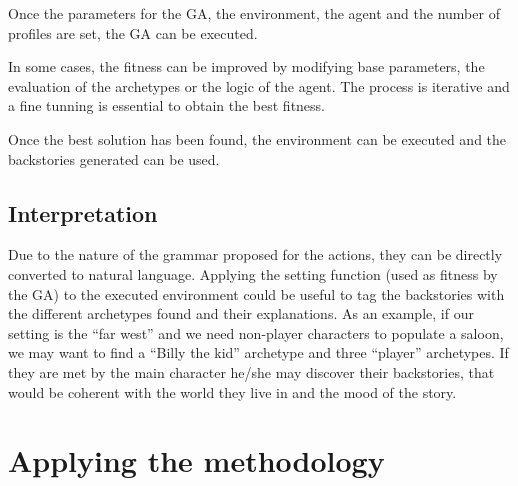 \documentclass{sig-alternate}
\begin{document}
Once the parameters for the GA, the environment, the agent and the number of profiles are set, the GA can be executed.

In some cases, the fitness can be improved by modifying base parameters, the evaluation of the archetypes or the logic of the agent. The process is iterative and a fine tunning is essential to obtain the best fitness.

Once the best solution has been found, the environment can be executed and the backstories generated can be used.

\subsection{Interpretation}


Due to the nature of the grammar proposed for the actions, they can be directly converted to natural language. Applying the setting function (used as fitness by the GA) to the executed environment could be useful to tag the backstories with the different archetypes found and their explanations. As an example, if our setting is the ``far west'' and we need non-player characters to populate a saloon, we may want to find a ``Billy the kid'' archetype and three ``player'' archetypes. If they are met by the main character he/she may discover their backstories, that would be coherent with the world they live in and the mood of the story.




\section{Applying the methodology}
\label{sec:applying}
\end{document}
